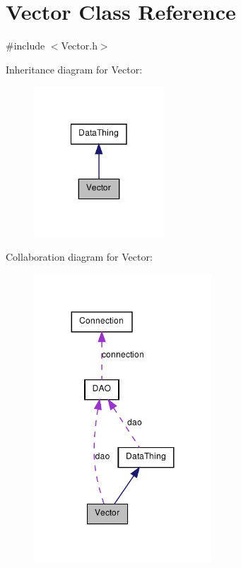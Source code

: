 \hypertarget{class_vector}{
\section{Vector Class Reference}
\label{class_vector}
}


{\ttfamily \#include $<$Vector.h$>$}



Inheritance diagram for Vector:\nopagebreak
\begin{figure}[H]
\begin{center}
\leavevmode
\includegraphics[width=138pt]{class_vector__inherit__graph}
\end{center}
\end{figure}


Collaboration diagram for Vector:\nopagebreak
\begin{figure}[H]
\begin{center}
\leavevmode
\includegraphics[width=188pt]{class_vector__coll__graph}
\end{center}
\end{figure}
